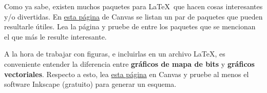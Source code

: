 \documentclass[11pt]{exam}
\begin{document}
\begin{questions}
\item Como ya sabe, existen muchos paquetes para \LaTeX\ que hacen cosas interesantes y/o divertidas. En \href{https://udec.instructure.com/courses/62342/pages/otros-paquetes-interesantes-para-latex?module_item_id=2334224}{esta página} de Canvas se listan un par de paquetes que pueden resultarle útiles. Lea la página y pruebe de entre los paquetes que se mencionan el que más le resulte interesante.

\item A la hora de trabajar con figuras, e incluirlas en un archivo \LaTeX, es conveniente entender la diferencia entre \textbf{gráficos de mapa de bits} y \textbf{gráficos vectoriales}. Respecto a esto, lea \href{https://udec.instructure.com/courses/62342/pages/sobre-graficos-de-mapas-de-bits-y-graficos-vectoriales}{esta página} en Canvas y pruebe al menos el software Inkscape (gratuito) para generar un esquema.

\end{questions}
\end{document}
